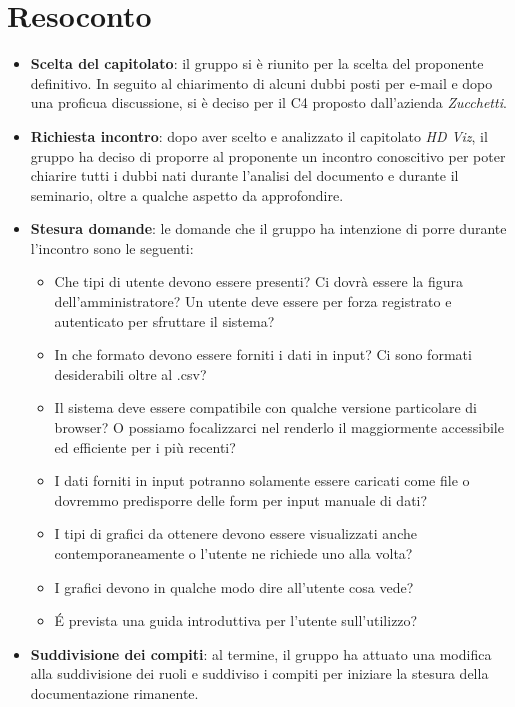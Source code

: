 \section{Resoconto}
\begin{itemize}

\item \textbf{Scelta del capitolato}: il gruppo si è riunito per la scelta del proponente definitivo. In seguito al chiarimento di alcuni dubbi posti per e-mail e dopo una proficua discussione, si è deciso per il  C4 proposto dall'azienda \textit{Zucchetti}.

\item \textbf{Richiesta incontro}: dopo aver scelto e analizzato il capitolato \textit{HD Viz}, il gruppo ha deciso di proporre al proponente un incontro conoscitivo per poter chiarire tutti i dubbi nati durante l’analisi del documento e durante il seminario, oltre a qualche aspetto da approfondire.

\item \textbf{Stesura domande}: le domande che il gruppo ha intenzione di porre durante l'incontro sono le seguenti:
\begin{itemize}
\item Che tipi di utente devono essere presenti? Ci dovrà essere la figura dell'amministratore? Un utente deve essere per forza registrato e autenticato per sfruttare il sistema?
\item In che formato devono essere forniti i dati in input? Ci sono formati desiderabili oltre al .csv?
\item Il sistema deve essere compatibile con qualche versione particolare di browser? O possiamo focalizzarci nel renderlo il maggiormente accessibile ed efficiente per i più recenti?
\item I dati forniti in input potranno solamente essere caricati come file o dovremmo predisporre delle form per input manuale di dati?
\item I tipi di grafici da ottenere devono essere visualizzati anche contemporaneamente o l'utente ne richiede uno alla volta?
\item I grafici devono in qualche modo dire all'utente cosa vede?
\item \'E prevista una guida introduttiva per l'utente sull'utilizzo?
\end{itemize}

\item \textbf{Suddivisione dei compiti}: al termine, il gruppo ha attuato una modifica alla suddivisione dei ruoli e suddiviso i compiti per iniziare la stesura della documentazione rimanente.

\end{itemize}